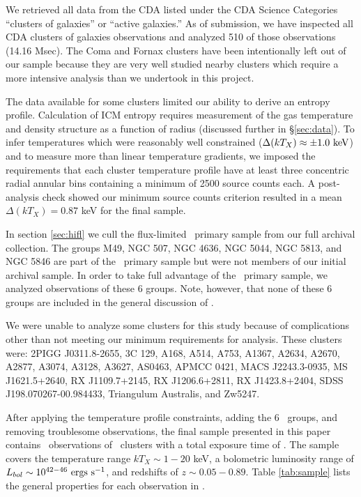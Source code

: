 \documentclass[12pt,preprint]{aastex}
\begin{document}
We retrieved all data from the CDA listed under the CDA Science
Categories ``clusters of galaxies'' or ``active galaxies.'' As of
submission, we have inspected all CDA clusters of galaxies
observations and analyzed 510 of those observations (14.16 Msec). The
Coma and Fornax clusters have been intentionally left out of our
sample because they are very well studied nearby clusters which
require a more intensive analysis than we undertook in this project.

The data available for some clusters limited our ability to derive an
entropy profile. Calculation of ICM entropy requires measurement of
the gas temperature and density structure as a function of radius
(discussed further in \S\ref{sec:data}). To infer temperatures which
were reasonably well constrained ($\Delta (kT_X) \approx \pm 1.0
\mbox{\ensuremath{\mathrm{~keV}}}$) and to measure more than linear temperature gradients, we
imposed the requirements that each cluster temperature profile have at
least three concentric radial annular bins containing a minimum of
2500 source counts each. A post-analysis check showed our minimum
source counts criterion resulted in a mean $\Delta (kT_X) = 0.87$ keV
for the final sample.

In section \ref{sec:hifl} we cull the flux-limited \hifl\ primary
sample \citep{hiflugcs1, hiflugcs2} from our full archival
collection. The groups M49, NGC 507, NGC 4636, NGC 5044, NGC 5813, and
NGC 5846 are part of the \hifl\ primary sample but were not members of
our initial archival sample. In order to take full advantage of the
\hifl\ primary sample, we analyzed observations of these 6
groups. Note, however, that none of these 6 groups are included in the
general discussion of
\accept.

We were unable to analyze some clusters for this study because of
complications other than not meeting our minimum requirements for
analysis. These clusters were: 2PIGG J0311.8-2655, 3C 129, A168, A514,
A753, A1367, A2634, A2670, A2877, A3074, A3128, A3627, AS0463, APMCC
0421, MACS J2243.3-0935, MS J1621.5+2640, RX J1109.7+2145, RX
J1206.6+2811, RX J1423.8+2404, SDSS J198.070267-00.984433, Triangulum
Australis, and Zw5247.

After applying the temperature profile constraints, adding the 6
\hifl\ groups, and removing troublesome observations, the final sample
presented in this paper contains \numobs\ observations of
\numcluster\ clusters with a total exposure time of \expt. The sample
covers the temperature range $kT_X \sim 1-20$ keV, a bolometric
luminosity range of $L_{bol} \sim 10^{42-46} \mathrm{\mbox{\ensuremath{\mathrm{~ergs}}} \mathrm{\mbox{\ensuremath{\mathrm{~s}}}^{-1}}}$, and redshifts of
$z \sim 0.05-0.89$. Table \ref{tab:sample} lists the general
properties for each observation in \accept.
\end{document}
